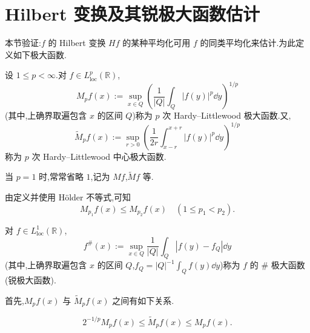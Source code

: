 \section{Hilbert 变换及其锐极大函数估计}\label{sec:1.4}


本节验证:$f$ 的 Hilbert 变换 $Hf$ 的某种平均化可用 $f$ 的同类平均化来估计.为此定义如下极大函数.

\begin{definition}\label{def:1.4.1}
设 $1 \leq p < \infty$.对 $f \in L_{\mathrm{loc}}^{p}(\mathbb{R})$,
\begin{equation*}
M_{p}f(x) := \sup_{x \in Q}\left(\frac{1}{|Q|}\int_{Q}|f(y)|^{p}\dd y\right)^{1/p}
\end{equation*}
(其中,上确界取遍包含 $x$ 的区间 $Q$)称为 $p$ 次 Hardy--Littlewood 极大函数.又,
\begin{equation*}
\tilde{M}_{p}f(x) := \sup_{r > 0}\left(\frac{1}{2r}\int_{x-r}^{x+r}|f(y)|^{p}\dd y\right)^{1/p}
\end{equation*}
称为 $p$ 次 Hardy--Littlewood 中心极大函数.

当 $p = 1$ 时,常常省略 $1$,记为 $Mf$,$\tilde{M}f$ 等.
\end{definition}

\begin{note}\label{note:1.4.2}
由定义并使用 Hölder 不等式,可知
\begin{equation*}
M_{p_{1}}f(x) \leq M_{p_{2}}f(x) \quad (1 \leq p_{1} < p_{2}).
\end{equation*}
\end{note}

\begin{definition}\label{def:1.4.3}
对 $f \in L_{\mathrm{loc}}^{1}(\mathbb{R})$,
\begin{equation*}
f^{\#}(x) := \sup_{x \in Q}\frac{1}{|Q|}\int_{Q}|f(y) - f_{Q}|\dd y
\end{equation*}
(其中,上确界取遍包含 $x$ 的区间 $Q$,$f_{Q} = |Q|^{-1}\int_{Q}f(y)\dd y$)称为 $f$ 的 $\#$ 极大函数(锐极大函数).
\end{definition}

首先,$M_{p}f(x)$ 与 $\tilde{M}_{p}f(x)$ 之间有如下关系.

\begin{lemma}\label{lem:1.4.4}
\begin{equation*}
2^{-1/p}M_{p}f(x) \leq \tilde{M}_{p}f(x) \leq M_{p}f(x).
\end{equation*}
\end{lemma}

